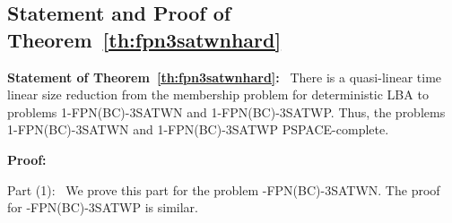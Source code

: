 \iffalse
\subsection{Statement and Proof of Corollary~\ref{th:pn3sat}}

\noindent
\textbf{Statement of Corollary~\ref{th:pn3sat}:}~
The problem 1-PN-3SAT is in NSPACE$(n)$.
There is a quasi-linear
time linear size reduction from the membership problem for non-deterministic
LBA to 1-FPN(BC)-3SAT.
Thus the  problem 1-PN-3SAT is PSPACE-complete. 

\medskip

\noindent
{\bf Proof:}  
Orlin \cite{Or82a} and Papadimitriou \cite{Pa94} have shown that
the problem {\sf 1-PN-3SAT} is in {\sf NSPACE(n)}. 
We only prove that the problem is {\sf PSPACE}-hard by a linear size
reduction from the membership problem for a non-deterministic {\sf LBA}.
(In contrast, The reduction in \cite{Or82a} is a square size reduction.)  
Observe that if an instance of {\sf 1-PN-3SAT} has a solution
then the assignment to the variables is periodic. If there are $n$ variables
in the static formula we can have no more than $2^{2n}$ distinct assignments to
the variables to consider. 
Hence starting from  an instance of {\sf 1-FPN-3SAT} 
$(F(U,C(i, i+1)),m)$ where $n = |U|$   and $m = 2^{2n}$ we  see that 
$F^m$ is satisfiable if and only if $F^{\infty}$ is satisfiable.
This completes the proof that the problem {\sf 1-PN-3SAT} is 
{\sf PSPACE}-complete. \hfill\QED
\fi

\subsection{Statement and Proof of Theorem~\ref{th:fpn3satwnhard}}

\noindent
\textbf{Statement of Theorem~\ref{th:fpn3satwnhard}:}~
There is a quasi-linear
time linear size reduction from the membership problem for deterministic
LBA to problems 1-FPN(BC)-3SATWN and  1-FPN(BC)-3SATWP.
Thus, the problems 1-FPN(BC)-3SATWN and  1-FPN(BC)-3SATWP PSPACE-complete.

\medskip

\noindent
{\bf Proof:} 

\smallskip

\noindent
Part (1):~
We prove  this part for the problem {-FPN(BC)-3SATWN}. 
The proof for {-FPN(BC)-3SATWP} is similar.

